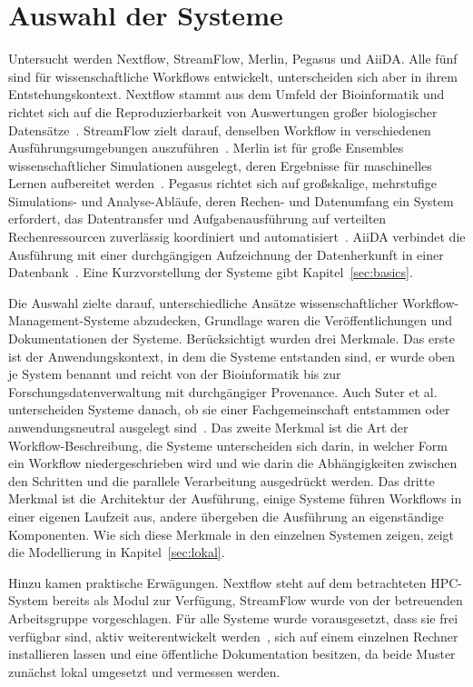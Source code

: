 \section{Auswahl der Systeme}
\label{sec:methodik:auswahl}
Untersucht werden Nextflow, StreamFlow, Merlin, Pegasus und AiiDA. Alle fünf sind für wissenschaftliche Workflows entwickelt, unterscheiden sich aber in ihrem Entstehungskontext. Nextflow stammt aus dem Umfeld der Bioinformatik und richtet sich auf die Reproduzierbarkeit von Auswertungen großer biologischer Datensätze~\cite[S.~316]{ditommaso2017nextflow}. StreamFlow zielt darauf, denselben Workflow in verschiedenen Ausführungsumgebungen auszuführen~\cite[S.~1723]{colonnelli2021streamflow}. Merlin ist für große Ensembles wissenschaftlicher Simulationen ausgelegt, deren Ergebnisse für maschinelles Lernen aufbereitet werden~\cite[S.~255]{peterson2022merlin}. Pegasus richtet sich auf großskalige, mehrstufige Simulations- und Analyse-Abläufe, deren Rechen- und Datenumfang ein System erfordert, das Datentransfer und Aufgabenausführung auf verteilten Rechenressourcen zuverlässig koordiniert und automatisiert~\cite[S.~17]{deelman2015pegasus}. AiiDA verbindet die Ausführung mit einer durchgängigen Aufzeichnung der Datenherkunft in einer Datenbank~\cite[S.~1]{huber2020aiida}. Eine Kurzvorstellung der Systeme gibt Kapitel~\ref{sec:basics}.

Die Auswahl zielte darauf, unterschiedliche Ansätze
wissenschaftlicher Workflow-Management-Systeme abzudecken, Grundlage
waren die Veröffentlichungen und Dokumentationen der Systeme.
Berücksichtigt wurden drei Merkmale. Das erste ist der
Anwendungskontext, in dem die Systeme entstanden sind, er wurde oben
je System benannt und reicht von der Bioinformatik bis zur
Forschungsdatenverwaltung mit durchgängiger Provenance. Auch Suter
et al. unterscheiden Systeme danach, ob sie einer Fachgemeinschaft
entstammen oder anwendungsneutral ausgelegt
sind~\cite[S.~4]{suter2026terminology}. Das zweite
Merkmal ist die Art der Workflow-Beschreibung, die Systeme
unterscheiden sich darin, in welcher Form ein Workflow
niedergeschrieben wird und wie darin die Abhängigkeiten zwischen den
Schritten und die parallele Verarbeitung ausgedrückt werden. Das
dritte Merkmal ist die Architektur der Ausführung, einige Systeme
führen Workflows in einer eigenen Laufzeit aus, andere übergeben die
Ausführung an eigenständige Komponenten. Wie sich diese Merkmale in den
einzelnen Systemen zeigen, zeigt die Modellierung in
Kapitel~\ref{sec:lokal}.

Hinzu kamen praktische Erwägungen. Nextflow steht auf dem
betrachteten HPC-System bereits als Modul zur Verfügung, StreamFlow
wurde von der betreuenden Arbeitsgruppe vorgeschlagen.
Für alle Systeme wurde vorausgesetzt, dass sie frei verfügbar sind, aktiv
weiterentwickelt werden~\cite{wcisystems}, sich auf einem einzelnen
Rechner installieren lassen und eine öffentliche Dokumentation
besitzen, da beide Muster zunächst lokal umgesetzt und vermessen
werden.

